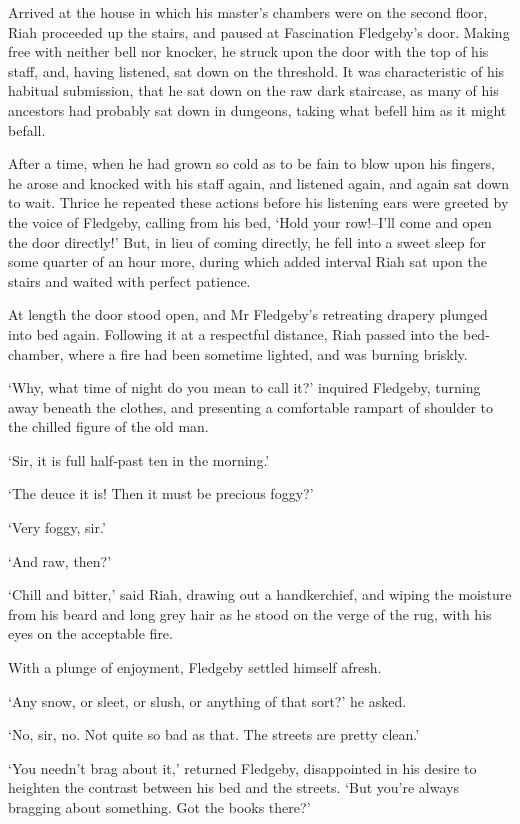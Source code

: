 Arrived at the house in which his master’s chambers were on the
second floor, Riah proceeded up the stairs, and paused at Fascination
Fledgeby’s door. Making free with neither bell nor knocker, he struck
upon the door with the top of his staff, and, having listened, sat down
on the threshold. It was characteristic of his habitual submission,
that he sat down on the raw dark staircase, as many of his ancestors
had probably sat down in dungeons, taking what befell him as it might
befall.

After a time, when he had grown so cold as to be fain to blow upon his
fingers, he arose and knocked with his staff again, and listened again,
and again sat down to wait. Thrice he repeated these actions before his
listening ears were greeted by the voice of Fledgeby, calling from his
bed, ‘Hold your row!--I’ll come and open the door directly!’ But, in
lieu of coming directly, he fell into a sweet sleep for some quarter of
an hour more, during which added interval Riah sat upon the stairs and
waited with perfect patience.

At length the door stood open, and Mr Fledgeby’s retreating drapery
plunged into bed again. Following it at a respectful distance, Riah
passed into the bed-chamber, where a fire had been sometime lighted, and
was burning briskly.

‘Why, what time of night do you mean to call it?’ inquired Fledgeby,
turning away beneath the clothes, and presenting a comfortable rampart
of shoulder to the chilled figure of the old man.

‘Sir, it is full half-past ten in the morning.’

‘The deuce it is! Then it must be precious foggy?’

‘Very foggy, sir.’

‘And raw, then?’

‘Chill and bitter,’ said Riah, drawing out a handkerchief, and wiping
the moisture from his beard and long grey hair as he stood on the verge
of the rug, with his eyes on the acceptable fire.

With a plunge of enjoyment, Fledgeby settled himself afresh.

‘Any snow, or sleet, or slush, or anything of that sort?’ he asked.

‘No, sir, no. Not quite so bad as that. The streets are pretty clean.’

‘You needn’t brag about it,’ returned Fledgeby, disappointed in his
desire to heighten the contrast between his bed and the streets. ‘But
you’re always bragging about something. Got the books there?’

